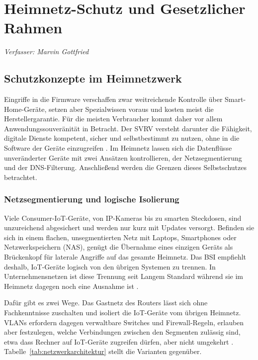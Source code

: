 
\chapter{Heimnetz-Schutz und Gesetzlicher Rahmen}
\noindent\textit{Verfasser: Marvin Gottfried}
\medskip

\section{Schutzkonzepte im Heimnetzwerk}
Eingriffe in die Firmware verschaffen zwar weitreichende Kontrolle über
Smart-Home-Geräte, setzen aber Spezialwissen voraus und kosten meist die
Herstellergarantie. Für die meisten Verbraucher kommt
daher vor allem Anwendungssouveränität in Betracht. Der \gls{SVRV} versteht darunter die Fähigkeit, digitale
Dienste kompetent, sicher und selbstbestimmt zu nutzen, ohne in die Software
der Geräte einzugreifen \cite[S. 12, ff.]{noauthor_digitale_2017}. Im Heimnetz lassen sich die
Datenflüsse unveränderter Geräte mit zwei Ansätzen kontrollieren, der
Netzsegmentierung und der DNS-Filterung. Anschließend werden die Grenzen
dieses Selbstschutzes betrachtet.

\subsection{Netzsegmentierung und logische Isolierung}
Viele Consumer-IoT-Geräte, von IP-Kameras bis zu smarten Steckdosen, sind
unzureichend abgesichert und werden nur kurz mit Updates versorgt. 
Befinden sie sich in einem flachen, unsegmentierten Netz mit
Laptops, Smartphones oder Netzwerkspeichern (\gls{NAS}), genügt die Übernahme eines
einzigen Geräts als Brückenkopf für laterale Angriffe auf das gesamte Heimnetz. 
Das \gls{BSI} empfiehlt deshalb, IoT-Geräte logisch von
den übrigen Systemen zu trennen. In Unternehmensnetzen ist diese
Trennung seit Langem Standard während sie im Heimnetz dagegen noch eine Ausnahme ist \cite{noauthor_smarthome_nodate}.

Dafür gibt es zwei Wege. Das Gastnetz des Routers lässt sich ohne
Fachkenntnisse zuschalten und isoliert die IoT-Geräte vom übrigen Heimnetz.
\glspl{VLAN} erfordern dagegen verwaltbare Switches und
Firewall-Regeln, erlauben aber festzulegen, welche Verbindungen zwischen den
Segmenten zulässig sind, etwa dass Rechner auf IoT-Geräte zugreifen dürfen,
aber nicht umgekehrt \cite{noauthor_smarthome_nodate}. Tabelle~\ref{tab:netzwerkarchitektur}
stellt die Varianten gegenüber.


